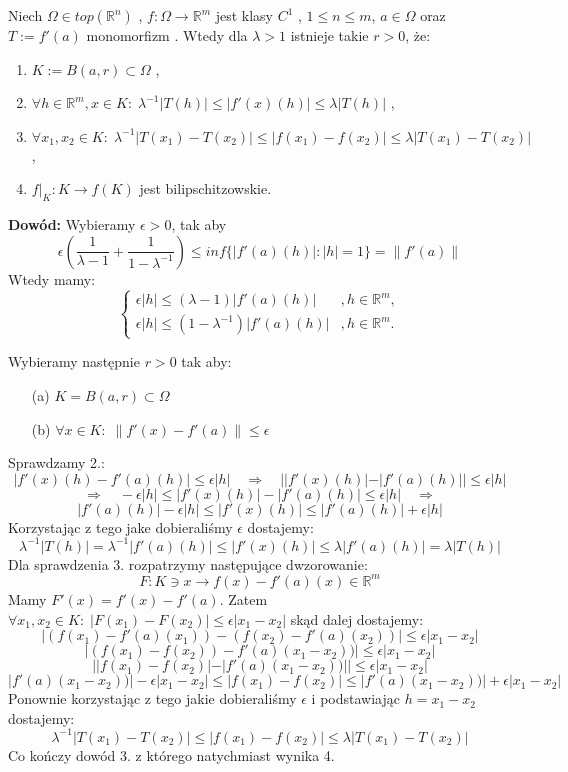 \begin{lem}
	Niech $\Omega \in top(\mathbb{R}^n)$ , $f: \Omega \rightarrow \mathbb{R}^m$ jest klasy $C^1$ , $1 \leq n \leq m$, $a \in \Omega$ oraz $T:= f'(a)$ monomorfizm . Wtedy dla $\lambda>1$ istnieje takie $r>0$, że:
	\begin{enumerate}
		\item $K:=B(a,r) \subset \Omega$ ,
		\item $\forall h \in \mathbb{R}^m, x \in K: \; \lambda^{-1}|T(h)| \leq |f'(x)(h)| \leq \lambda|T(h)|$ ,
		\item $\forall x_1, x_2 \in K: \; \lambda^{-1}|T(x_1) - T(x_2)| \leq |f(x_1) - f(x_2)| \leq \lambda|T(x_1) - T(x_2)|$ ,
		\item $f|_K: K \rightarrow f(K)$ jest bilipschitzowskie.
	\end{enumerate}

	\textbf{Dowód:}\newline
	Wybieramy $\epsilon > 0$, tak aby $$
		\epsilon (\frac{1}{\lambda-1} + \frac{1}{1 - \lambda^{-1}}) \leq inf\{|f'(a)(h)|: |h|=1\} = \|f'(a)\|
	$$
	Wtedy mamy: 
	\begin{equation}
		\begin{cases}
		\epsilon |h| \leq (\lambda-1) |f'(a)(h)| & , h \in \mathbb{R}^m ,\\
		\epsilon |h| \leq (1 - \lambda^{-1}) |f'(a)(h)| & , h \in \mathbb{R}^m .
		\end{cases}
	\end{equation}

	Wybieramy następnie $r>0$ tak aby:
	\begin{enumerate}
		\item[(a)] $K = B(a,r) \subset \Omega$ 
		\item[(b)] $\forall x \in K: \; \| f'(x) - f'(a) \| \leq \epsilon$
	\end{enumerate}
	Sprawdzamy 2.: 
	$$ 
		|f'(x)(h) - f'(a)(h)| \leq \epsilon|h| \quad \Longrightarrow \quad
		||f'(x)(h)| - |f'(a)(h)|| \leq \epsilon|h| 
	$$
	$$
		\quad \Longrightarrow \quad
		-\epsilon|h| \leq |f'(x)(h)| - |f'(a)(h)| \leq \epsilon|h| \quad \Longrightarrow \quad
	$$
	$$
		|f'(a)(h)| - \epsilon|h| \leq |f'(x)(h)| \leq |f'(a)(h)| + \epsilon|h|
	$$
	Korzystając z tego jake dobieraliśmy $\epsilon$ dostajemy: $$
		\lambda^{-1}|T(h)| = \lambda^{-1}|f'(a)(h)| \leq |f'(x)(h)| \leq \lambda|f'(a)(h)| = \lambda|T(h)|
	$$
	Dla sprawdzenia 3. rozpatrzymy następujące dwzorowanie: $$
		F: K \ni x \rightarrow f(x) - f'(a)(x) \in \mathbb{R}^m
	$$
	Mamy $F'(x) = f'(x) - f'(a)$. Zatem $\forall x_1, x_2 \in K: \; |F(x_1) - F(x_2)| \leq \epsilon |x_1 - x_2|$ skąd dalej dostajemy: $$
		|(f(x_1) - f'(a)(x_1)) - (f(x_2) - f'(a)(x_2))| \leq \epsilon|x_1 - x_2|
	$$
	$$
		|(f(x_1) - f(x_2)) - f'(a)(x_1-x_2))| \leq \epsilon|x_1 - x_2|
	$$
	$$
		||f(x_1) - f(x_2)| - |f'(a)(x_1-x_2))|| \leq \epsilon|x_1 - x_2|
	$$
	$$
		|f'(a)(x_1-x_2))| - \epsilon|x_1 - x_2| \leq |f(x_1) - f(x_2)| \leq |f'(a)(x_1-x_2))| + \epsilon|x_1 - x_2|
	$$
	Ponownie korzystając z tego jakie dobieraliśmy $\epsilon$ i podstawiając $h = x_1 - x_2$ dostajemy: $$
		\lambda^{-1}|T(x_1) - T(x_2)| \leq |f(x_1) - f(x_2)| \leq \lambda | T(x_1) - T(x_2)|
	$$
	Co kończy dowód 3. z którego natychmiast wynika 4.

\end{lem}